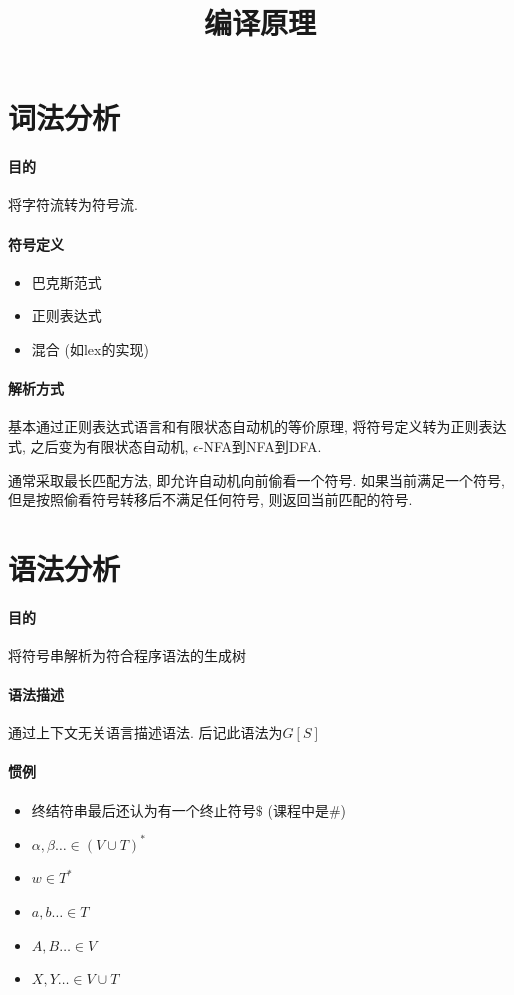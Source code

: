 \documentclass{ctexart}
\title{编译原理}
\begin{document}
\maketitle

\tableofcontents

\section{词法分析}
\paragraph{目的}
    将字符流转为符号流.
\paragraph{符号定义} \begin{itemize}
        \item 巴克斯范式
        \item 正则表达式
        \item 混合 (如lex的实现)
    \end{itemize}
\paragraph{解析方式}
    基本通过正则表达式语言和有限状态自动机的等价原理, 将符号定义转为正则表达式,
    之后变为有限状态自动机, $\epsilon$-NFA到NFA到DFA.\par
    通常采取最长匹配方法, 即允许自动机向前偷看一个符号.
    如果当前满足一个符号, 但是按照偷看符号转移后不满足任何符号, 则返回当前匹配的符号.

\section{语法分析}
\paragraph{目的}
    将符号串解析为符合程序语法的生成树
\paragraph{语法描述}
    通过上下文无关语言描述语法. 后记此语法为$G[S]$
\paragraph{惯例} \begin{itemize}
        \item 终结符串最后还认为有一个终止符号$\$$ (课程中是$\#$)
        \item $\alpha, \beta \ldots \in (V\cup T)^*$
        \item $w \in T^*$
        \item $a, b \ldots \in T$
        \item $A, B \ldots \in V$
        \item $X, Y \ldots \in V\cup T$
    \end{itemize}
\end{document}
